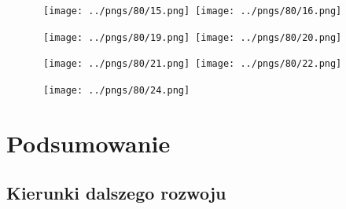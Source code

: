 \begin{figure}[H]
\centering
\mbox{
\texttt{[image: ../pngs/80/15.png]} \quad
\texttt{[image: ../pngs/80/16.png]} 
}
\end{figure}

\begin{figure}[H]
\centering
\mbox{
\texttt{[image: ../pngs/80/19.png]} \quad
\texttt{[image: ../pngs/80/20.png]} 
}
\end{figure}

\begin{figure}[H]
\centering
\mbox{
\texttt{[image: ../pngs/80/21.png]} \quad
\texttt{[image: ../pngs/80/22.png]} 
}
\end{figure}

\begin{figure}[H]
\centering
\mbox{
\texttt{[image: ../pngs/80/24.png]} \quad
}
\end{figure}

\chapter{Podsumowanie}

\section{Kierunki dalszego rozwoju}